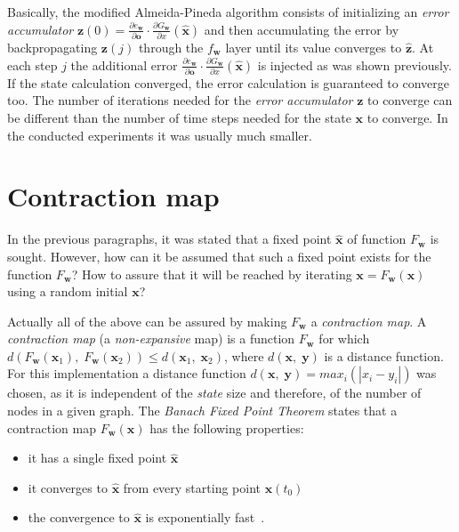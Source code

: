 Basically, the modified Almeida-Pineda algorithm consists of initializing an \emph{error accumulator} $\bm{z}(0) = \frac{\partial e_{\bm{w}}}{\partial \bm{o}}\cdot \frac{\partial G_{\bm{w}}}{\partial x}(\hat{\bm{x}})$ and then accumulating the error by backpropagating $\bm{z}(j)$ through the $f_{\bm{w}}$ layer until its value converges to $\hat{\bm{z}}$. At each step $j$ the additional error $\frac{\partial e_{\bm{w}}}{\partial \bm{o}}\cdot \frac{\partial G_{\bm{w}}}{\partial x}(\hat{\bm{x}})$ is injected as was shown previously. If the state calculation converged, the error calculation is guaranteed to converge too. The number of iterations needed for the \emph{error accumulator} $\bm{z}$ to converge can be different than the number of time steps needed for the state $\bm{x}$ to converge. In the conducted experiments it was usually much smaller.


\section{Contraction map\label{sec:contraction}}
In the previous paragraphs, it was stated that a fixed point $\hat{\bm{x}}$ of function $F_{\bm{w}}$ is sought. However, how can it be assumed that such a fixed point exists for the function $F_{\bm{w}}$? How to assure that it will be reached by iterating $\bm{x} = F_{\bm{w}}(\bm{x})$ using a random initial $\bm{x}$?

Actually all of the above can be assured by making $F_{\bm{w}}$ a \emph{contraction map}. A \emph{contraction map} (a \emph{non-expansive} map) is a function $F_{\bm{w}}$ for which $d(F_{\bm{w}}(\bm{x}_1), \; F_{\bm{w}}(\bm{x}_2)) \leq d(\bm{x}_1, \; \bm{x}_2)$, where $d(\bm{x}, \; \bm{y})$ is a distance function. For this implementation a distance function $d(\bm{x}, \; \bm{y}) = max_i(|x_{i} - y_{i}|)$ was chosen, as it is independent of the \emph{state} size and therefore, of the number of nodes in a given graph. The \emph{Banach Fixed Point Theorem} states that a contraction map $F_{\bm{w}}(\bm{x})$ has the following properties:
\begin{itemize}
	\item it has a single fixed point $\hat{\bm{x}}$
	\item it converges to $\hat{\bm{x}}$ from every starting point $\bm{x}(t_0)$
	\item the convergence to  $\hat{\bm{x}}$ is exponentially fast~\cite{scarselli2009graph}.
\end{itemize}

